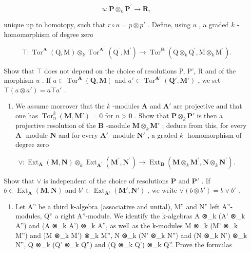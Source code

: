 \[
u: \mathbf {P} \otimes_ {k} \mathbf {P} ^ {\prime} \rightarrow \mathbf {R},
\]

unique up to homotopy, such that \(r \circ u = p \otimes p'\) . Define, using \(u\) , a graded \(k\) -homomorphism of degree zero

\[
\top : \operatorname{Tor} ^ {\mathbf {A}} (\mathrm{Q}, \mathrm{M}) \otimes_ {k} \operatorname{Tor} ^ {\mathbf {A} ^ {\prime}} (\mathrm{Q} ^ {\prime}, \mathrm{M} ^ {\prime}) \rightarrow \operatorname{Tor} ^ {\mathbf {B}} (\mathrm{Q} \otimes_ {k} \mathrm{Q} ^ {\prime}, \mathrm{M} \otimes_ {k} \mathrm{M} ^ {\prime}).
\]

Show that \(\top\) does not depend on the choice of resolutions P, P', R and of the morphism \(u\) . If \(a \in \operatorname{Tor}^{\mathbf{A}}(\mathbf{Q}, \mathbf{M})\) and \(a' \in \operatorname{Tor}^{\mathbf{A}'}(\mathbf{Q}', \mathbf{M}')\) , we set \(\top(a \otimes a') = a \top a'\) .

\begin{enumerate}
\def\labelenumi{\alph{enumi})}
\setcounter{enumi}{1}
\tightlist
\item
  We assume moreover that the \(k\) -modules \(\mathbf{A}\) and \(\mathbf{A}'\) are projective and that one has \(\operatorname{Tor}_n^k (\mathbf{M},\mathbf{M}') = 0\) for \(n > 0\) . Show that \(\mathbf{P} \otimes_k \mathbf{P}'\) is then a projective resolution of the \(\mathbf{B}\) -module \(\mathbf{M} \otimes_k \mathbf{M}'\) ; deduce from this, for every \(\mathbf{A}\) -module \(\mathbf{N}\) and for every \(\mathbf{A}'\) -module \(\mathbf{N}'\) , a graded \(k\) -homomorphism of degree zero
\end{enumerate}

\[
\vee : \operatorname{Ext} _ {\mathbf {A}} (\mathbf {M}, \mathbf {N}) \otimes_ {k} \operatorname{Ext} _ {\mathbf {A} ^ {\prime}} (\mathbf {M} ^ {\prime}, \mathbf {N} ^ {\prime}) \rightarrow \operatorname{Ext} _ {\mathbf {B}} (\mathbf {M} \otimes_ {k} \mathbf {M} ^ {\prime}, \mathbf {N} \otimes_ {k} \mathbf {N} ^ {\prime}).
\]

Show that \(\vee\) is independent of the choice of resolutions \(\mathbf{P}\) and \(\mathbf{P}'\) . If \(b \in \operatorname{Ext}_{\mathbf{A}}(\mathbf{M}, \mathbf{N})\) and \(b' \in \operatorname{Ext}_{\mathbf{A}'}(\mathbf{M}', \mathbf{N}')\) , we write \(\vee (b \otimes b') = b \vee b'\) .

\begin{enumerate}
\def\labelenumi{\alph{enumi})}
\setcounter{enumi}{2}
\tightlist
\item
  Let A'' be a third k-algebra (associative and unital), M'' and N'' left A''-modules, Q'' a right A''-module. We identify the k-algebras A ⊗\_k (A' ⊗\_k A'') and (A ⊗\_k A') ⊗\_k A'', as well as the k-modules M ⊗\_k (M' ⊗\_k M'') and (M ⊗\_k M') ⊗\_k M'', N ⊗\_k (N' ⊗\_k N'') and (N ⊗\_k N') ⊗\_k N'', Q ⊗\_k (Q' ⊗\_k Q'') and (Q ⊗\_k Q') ⊗\_k Q''. Prove the formulas
\end{enumerate}

